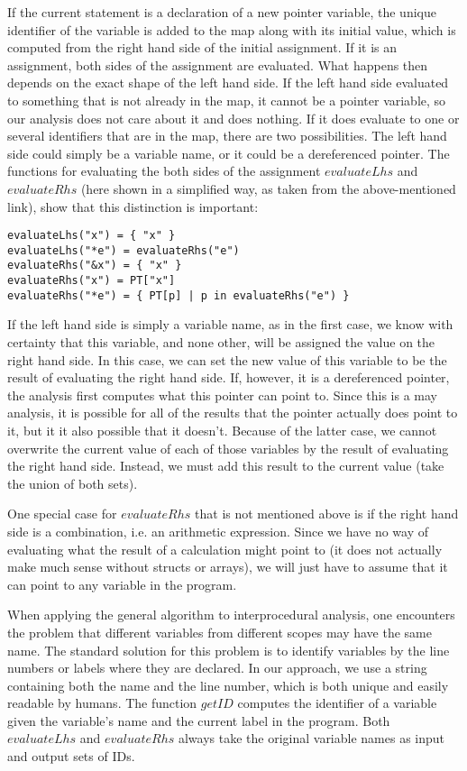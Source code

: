 \documentclass[a4paper,11pt]{article}
\begin{document}
If the current statement is a declaration of a new pointer variable, the unique identifier of the variable is added to the map along with its initial value, which is computed from the right hand side of the initial assignment. If it is an assignment, both sides of the assignment are evaluated. What happens then depends on the exact shape of the left hand side. If the left hand side evaluated to something that is not already in the map, it cannot be a pointer variable, so our analysis does not care about it and does nothing. If it does evaluate to one or several identifiers that are in the map, there are two possibilities. The left hand side could simply be a variable name, or it could be a dereferenced pointer. The functions for evaluating the both sides of the assignment $evaluateLhs$ and $evaluateRhs$ (here shown in a simplified way, as taken from the above-mentioned link), show that this distinction is important:
\begin{lstlisting}
evaluateLhs("x") = { "x" }
evaluateLhs("*e") = evaluateRhs("e")
evaluateRhs("&x") = { "x" }
evaluateRhs("x") = PT["x"]
evaluateRhs("*e") = { PT[p] | p in evaluateRhs("e") }
\end{lstlisting}
If the left hand side is simply a variable name, as in the first case, we know with certainty that this variable, and none other, will be assigned the value on the right hand side. In this case, we can set the new value of this variable to be the result of evaluating the right hand side. If, however, it is a dereferenced pointer, the analysis first computes what this pointer can point to. Since this is a may analysis, it is possible for all of the results that the pointer actually does point to it, but it it also possible that it doesn't. Because of the latter case, we cannot overwrite the current value of each of those variables by the result of evaluating the right hand side. Instead, we must add this result to the current value (take the union of both sets). 

One special case for $evaluateRhs$ that is not mentioned above is if the right hand side is a combination, i.e. an arithmetic expression. Since we have no way of evaluating what the result of a calculation might point to (it does not actually make much sense without structs or arrays), we will just have to assume that it can point to any variable in the program.

When applying the general algorithm to interprocedural analysis, one encounters the problem that different variables from different scopes may have the same name. The standard solution for this problem is to identify variables by the line numbers or labels where they are declared. In our approach, we use a string containing both the name and the line number, which is both unique and easily readable by humans. The function $getID$ computes the identifier of a variable given the variable's name and the current label in the program. Both $evaluateLhs$ and $evaluateRhs$ always take the original variable names as input and output sets of IDs.
\end{document}
